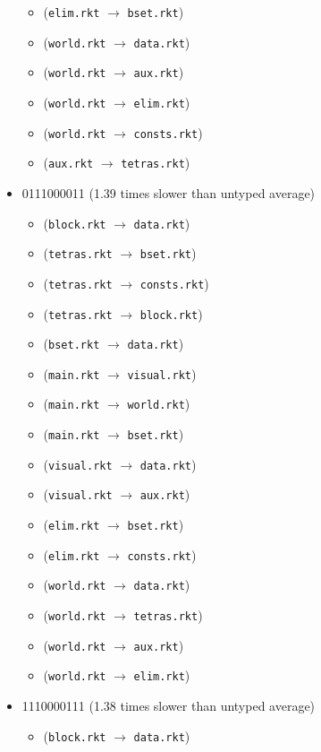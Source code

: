 \documentclass{article}
\newcommand{\mono}[1]{\texttt{#1}}
\begin{document}
\begin{itemize}
\begin{itemize}
  \item (\mono{elim.rkt} $\rightarrow$ \mono{bset.rkt})
  \item (\mono{world.rkt} $\rightarrow$ \mono{data.rkt})
  \item (\mono{world.rkt} $\rightarrow$ \mono{aux.rkt})
  \item (\mono{world.rkt} $\rightarrow$ \mono{elim.rkt})
  \item (\mono{world.rkt} $\rightarrow$ \mono{consts.rkt})
  \item (\mono{aux.rkt} $\rightarrow$ \mono{tetras.rkt})
  \end{itemize}
\item 0111000011 (1.39 times slower than untyped average)
  \begin{itemize}
  \item (\mono{block.rkt} $\rightarrow$ \mono{data.rkt})
  \item (\mono{tetras.rkt} $\rightarrow$ \mono{bset.rkt})
  \item (\mono{tetras.rkt} $\rightarrow$ \mono{consts.rkt})
  \item (\mono{tetras.rkt} $\rightarrow$ \mono{block.rkt})
  \item (\mono{bset.rkt} $\rightarrow$ \mono{data.rkt})
  \item (\mono{main.rkt} $\rightarrow$ \mono{visual.rkt})
  \item (\mono{main.rkt} $\rightarrow$ \mono{world.rkt})
  \item (\mono{main.rkt} $\rightarrow$ \mono{bset.rkt})
  \item (\mono{visual.rkt} $\rightarrow$ \mono{data.rkt})
  \item (\mono{visual.rkt} $\rightarrow$ \mono{aux.rkt})
  \item (\mono{elim.rkt} $\rightarrow$ \mono{bset.rkt})
  \item (\mono{elim.rkt} $\rightarrow$ \mono{consts.rkt})
  \item (\mono{world.rkt} $\rightarrow$ \mono{data.rkt})
  \item (\mono{world.rkt} $\rightarrow$ \mono{tetras.rkt})
  \item (\mono{world.rkt} $\rightarrow$ \mono{aux.rkt})
  \item (\mono{world.rkt} $\rightarrow$ \mono{elim.rkt})
  \end{itemize}
\item 1110000111 (1.38 times slower than untyped average)
  \begin{itemize}
  \item (\mono{block.rkt} $\rightarrow$ \mono{data.rkt})

\end{itemize}
\end{itemize}
\end{document}
